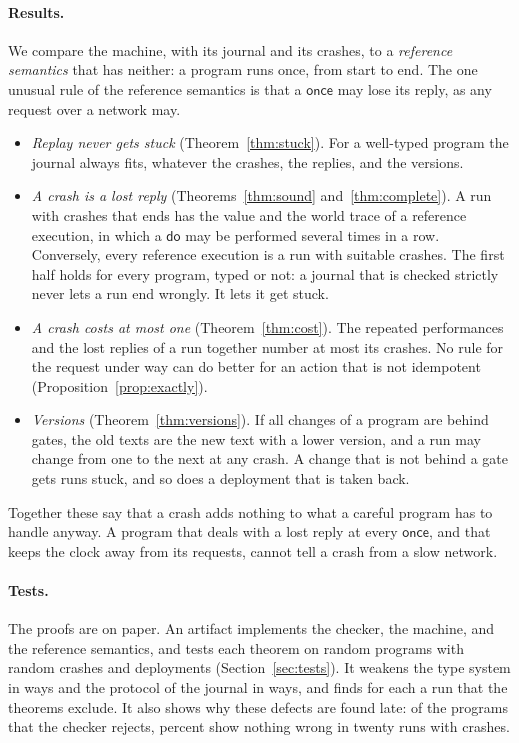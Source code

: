 \documentclass[acmsmall,nonacm,screen]{acmart}
\newcommand{\kw}[1]{\mathsf{#1}}
\begin{document}
\paragraph{Results.} We compare the machine, with its journal and its crashes, to a
\emph{reference semantics} that has neither: a program runs once, from start to end. The one
unusual rule of the reference semantics is that a $\kw{once}$ may lose its reply, as any
request over a network may.
\begin{itemize}
\item \emph{Replay never gets stuck} (Theorem~\ref{thm:stuck}). For a well-typed program the
  journal always fits, whatever the crashes, the replies, and the versions.
\item \emph{A crash is a lost reply} (Theorems~\ref{thm:sound} and~\ref{thm:complete}). A run
  with crashes that ends has the value and the world trace of a reference execution, in which
  a $\kw{do}$ may be performed several times in a row. Conversely, every reference execution
  is a run with suitable crashes. The first half holds for every program, typed or not: a
  journal that is checked strictly never lets a run end wrongly. It lets it get stuck.
\item \emph{A crash costs at most one} (Theorem~\ref{thm:cost}). The repeated performances and
  the lost replies of a run together number at most its crashes. No rule for the request
  under way can do better for an action that is not idempotent
  (Proposition~\ref{prop:exactly}).
\item \emph{Versions} (Theorem~\ref{thm:versions}). If all changes of a program are behind
  gates, the old texts are the new text with a lower version, and a run may change from one to
  the next at any crash. A change that is not behind a gate gets runs stuck, and so does a
  deployment that is taken back.
\end{itemize}
Together these say that a crash adds nothing to what a careful program has to handle anyway.
A program that deals with a lost reply at every $\kw{once}$, and that keeps the clock away
from its requests, cannot tell a crash from a slow network.

\paragraph{Tests.} The proofs are on paper. An artifact implements the checker, the machine,
and the reference semantics, and tests each theorem on random programs with random crashes
and deployments (Section~\ref{sec:tests}). It weakens the type system in \exRules{} ways and
the protocol of the journal in \exSteps{} ways, and finds for each a run that the theorems
exclude. It also shows why these defects are found late: of the programs that the checker
rejects, \exQuietPercent{} percent show nothing wrong in twenty runs with crashes.
\end{document}
